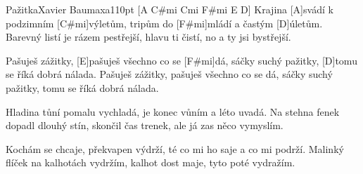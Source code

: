 \begin{song}{Pažitka}{Xavier Baumaxa}{110pt}
[A C#mi Cmi F#mi E D]{}
%
Krajina [A]svádí k podzimním [C#mi]výletům,
tripům do [F#mi]mládí a častým [D]{ú}letům.
Barevný listí je rázem pestřejší,
hlavu ti čistí, no a ty jsi bystřejší.

\chorus%
[A]Pašuješ zážitky, [E]pašuješ všechno co se [F#mi]dá,
sáčky suchý pažitky, [D]tomu se říká dobrá nálada.
Pašuješ zážitky, pašuješ všechno co se dá,
sáčky suchý pažitky, tomu se říká dobrá nálada.

%
Hladina tůní pomalu vychladá,
je konec vůním a léto uvadá.
Na stehna fenek dopadl dlouhý stín,
skončil čas trenek, ale já zas něco vymyslím.
\repchor

%
Kochám se chcaje, překvapen výdrží,
té co mi ho saje a co mi podrží.
Malinký flíček na kalhotách vydržím,
kalhot dost maje, tyto poté vydražím.
\repchor

\end{song}

